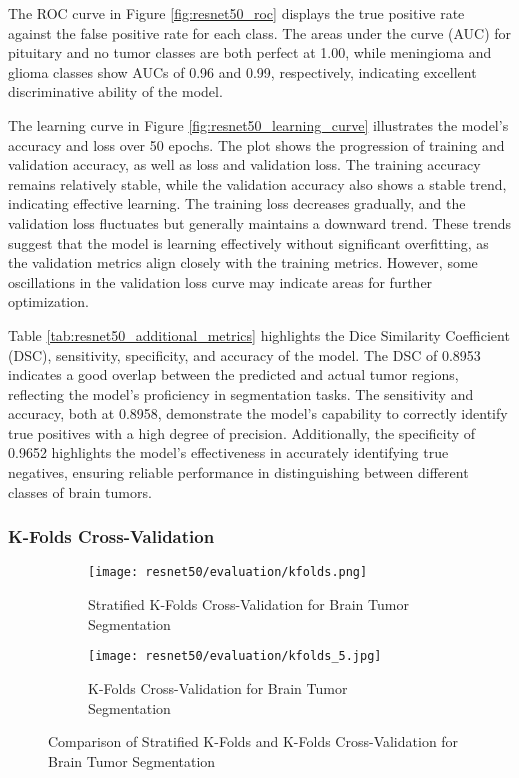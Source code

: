 The ROC curve in Figure \ref{fig:resnet50_roc} displays the true positive rate against the false positive rate for each class. The areas under the curve (AUC) for pituitary and no tumor classes are both perfect at 1.00, while meningioma and glioma classes show AUCs of 0.96 and 0.99, respectively, indicating excellent discriminative ability of the model.

The learning curve in Figure \ref{fig:resnet50_learning_curve} illustrates the model's accuracy and loss over 50 epochs. The plot shows the progression of training and validation accuracy, as well as loss and validation loss. The training accuracy remains relatively stable, while the validation accuracy also shows a stable trend, indicating effective learning. The training loss decreases gradually, and the validation loss fluctuates but generally maintains a downward trend. These trends suggest that the model is learning effectively without significant overfitting, as the validation metrics align closely with the training metrics. However, some oscillations in the validation loss curve may indicate areas for further optimization.

Table \ref{tab:resnet50_additional_metrics} highlights the Dice Similarity Coefficient (DSC), sensitivity, specificity, and accuracy of the model. The DSC of 0.8953 indicates a good overlap between the predicted and actual tumor regions, reflecting the model's proficiency in segmentation tasks. The sensitivity and accuracy, both at 0.8958, demonstrate the model's capability to correctly identify true positives with a high degree of precision. Additionally, the specificity of 0.9652 highlights the model's effectiveness in accurately identifying true negatives, ensuring reliable performance in distinguishing between different classes of brain tumors.

\subsubsection{K-Folds Cross-Validation}

\begin{figure}[H]
  \centering
  \begin{subfigure}[b]{0.45\textwidth}
    \centering
    \texttt{[image: resnet50/evaluation/kfolds.png]}
    \caption{Stratified K-Folds Cross-Validation for Brain Tumor Segmentation}\label{f:resnet50_kfolds}
  \end{subfigure}
  \hfill
  \begin{subfigure}[b]{0.45\textwidth}
    \centering
    \texttt{[image: resnet50/evaluation/kfolds\_5.jpg]}
    \caption{K-Folds Cross-Validation for Brain Tumor Segmentation}\label{f:resnet50_kfolds_5}
  \end{subfigure}
  \caption{Comparison of Stratified K-Folds and K-Folds Cross-Validation for Brain Tumor Segmentation}\label{f:resnet50_kfolds_comparison}
\end{figure}

